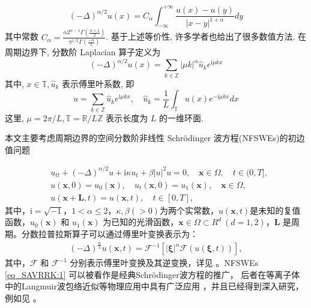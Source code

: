 \begin{equation}
(-\Delta)^{\alpha / 2} u(x)=C_\alpha \int_{-\infty}^{+\infty} \frac{u(x)-u(y)}{|x-y|^{1+\alpha}} d y
\end{equation}
其中常数 $C_\alpha=\frac{\alpha 2^{\alpha-1} \Gamma\left(\frac{\alpha+1}{2}\right)}{\pi^{1 / 2} \Gamma\left(\frac{-\alpha}{2}\right)}$. 基于上述等价性, 许多学者也给出了很多数值方法\cite{gaoMeanExitTime2014,huangNumericalMethodsFractional2014}. 在周期边界下, 分数阶 Laplacian 算子定义为 \cite{guoFractionalPartialDifferential2015}
\begin{equation}
(-\Delta)^{\alpha / 2} u(x)=\sum_{k \in \mathbb{Z}}|\mu k|^\alpha \hat{u}_k e^{\mathrm{i} \mu k x}
\end{equation}
其中, $x \in \mathbb{T}, \hat{u}_k$ 表示傅里叶系数, 即
\begin{equation}
u=\sum_{k \in \mathbb{Z}} \hat{u}_k e^{\mathrm{i} \mu k x}, \quad \hat{u}_k=\frac{1}{L} \int_{\mathbb{T}} u(x) e^{-\mathrm{i} \mu k x} d x
\end{equation}
这里, $\mu=2 \pi / L, \mathbb{T}=\mathbb{R} / L \mathbb{Z}$ 表示长度为 $L$ 的一维环面.


本文主要考虑周期边界的空间分数阶非线性 Schr{\"o}dinger 波方程(NFSWEs)的初边值问题

\begin{align}
&  u_{t t}+(-\Delta)^{\alpha / 2} u+\mathrm{i} \kappa u_{t}+\beta|u|^{2} u=0, \quad \boldsymbol{x} \in \Omega, \quad  t \in(0, T],\label{eq_SAVRRK:1}\\
& u(\boldsymbol{x}, 0)=u_{0}(\boldsymbol{x}), \quad u_{t}(\boldsymbol{x}, 0)=u_{1}(\boldsymbol{x}),\quad \boldsymbol{x} \in \Omega, \label{eq_SAVRRK:2}\\
& u(\boldsymbol{x}+\boldsymbol{L}, t)=u(\boldsymbol{x}, t), \quad t \in[0, T],\label{eq_SAVRRK:3}
\end{align}
其中，$\mathrm{i}=\sqrt{-1}$，$1<\alpha \leq 2$，$\kappa, \beta(>0)$为两个实常数，$u(\boldsymbol{x}, t)$是未知的复值函数，$u_{0}(\boldsymbol{x})$ 和 $u_{1}(\boldsymbol{x})$ 为已知的光滑函数，$\boldsymbol{x}\in\Omega\!\subset\!
R^d~(d\!=\!1,2)$，$\boldsymbol{L}$ 是周期。分数拉普拉斯算子可以通过傅里叶变换表示为：
\begin{align}\label{eq_SAVRRK:4}
(-\Delta)^{\frac{\alpha}{2}} u(\boldsymbol{x},t)=\mathcal{F}^{-1}\left[|\boldsymbol{\xi}|^{\alpha} \mathcal{F}(u(\boldsymbol{\xi},t))\right],
\end{align}
其中，$\mathcal{F}$ 和 $\mathcal{F}^{-1}$ 分别表示傅里叶变换及其逆变换，详见 \cite{caffarelliExtensionProblemRelated2007}。NFSWEs \eqref{eq_SAVRRK:1} 可以被看作是经典Schr{\"o}dinger波方程的推广，
后者在等离子体中的Langmuir波包络近似等物理应用中具有广泛应用 \cite{colinSemidiscretizationTimeNonlinear1998}，并且已经得到深入研究，例如见 \cite{zhangConservativeNumericalScheme2003,baoUniformErrorEstimates2012,chengSeveralConservativeCompact2018,brugnanoClassEnergyconservingHamiltonian2018}。

